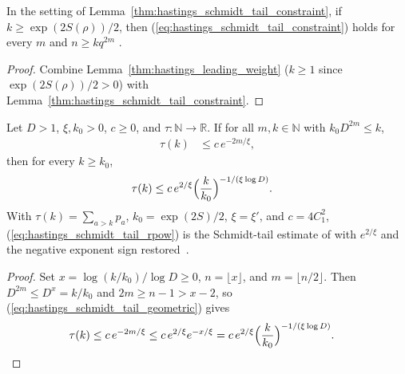\begin{lemma}
    \label{thm:hastings_schmidt_tail_constraint_entropy}
    \leanok
    In the setting of Lemma~\ref{thm:hastings_schmidt_tail_constraint}, if
    $k\ge\exp(2S(\rho))/2$, then (\ref{eq:hastings_schmidt_tail_constraint})
    holds for every $m$ and $n\ge kq^{2m}$
    \cite[lines 540--546]{Hastings2007AreaLaw}.
\end{lemma}
\begin{proof}\leanok
    Combine Lemma~\ref{thm:hastings_leading_weight} ($k\ge1$ since
    $\exp(2S(\rho))/2>0$) with
    Lemma~\ref{thm:hastings_schmidt_tail_constraint}.
\end{proof}

\begin{lemma}
    \label{thm:hastings_schmidt_tail_rpow}
    \leanok
    Let $D>1$, $\xi,k_0>0$, $c\ge0$, and $\tau\colon\mathbb N\to\mathbb R$. If
    for all $m,k\in\mathbb N$ with $k_0D^{2m}\le k$,
    \begin{align}
        \tau(k) & \le c\,e^{-2m/\xi},
        \label{eq:hastings_schmidt_tail_geometric}
    \end{align}
    then for every $k\ge k_0$,
    \begin{align}
        \tau(k) & \le c\,e^{2/\xi}\Bigl(\frac{k}{k_0}\Bigr)^{-1/(\xi\log D)}.
        \label{eq:hastings_schmidt_tail_rpow}
    \end{align}
    With $\tau(k)=\sum_{a>k}p_a$, $k_0=\exp(2S)/2$, $\xi=\xi'$, and $c=4C_1^2$,
    (\ref{eq:hastings_schmidt_tail_rpow}) is the Schmidt-tail estimate of
    \cite[lines 547--550]{Hastings2007AreaLaw} with $e^{2/\xi}$ and the negative
    exponent sign restored~\cite{gap:hastings07_schmidt_tail_constant}.
\end{lemma}
\begin{proof}\leanok
    Set $x=\log(k/k_0)/\log D\ge0$, $n=\lfloor x\rfloor$, and
    $m=\lfloor n/2\rfloor$. Then $D^{2m}\le D^x=k/k_0$ and $2m\ge n-1>x-2$, so
    (\ref{eq:hastings_schmidt_tail_geometric}) gives
    \begin{align}
        \tau(k) & \le c\,e^{-2m/\xi}\le c\,e^{2/\xi}e^{-x/\xi}
        =c\,e^{2/\xi}\Bigl(\frac{k}{k_0}\Bigr)^{-1/(\xi\log D)}.
        \notag
    \end{align}
\end{proof}

